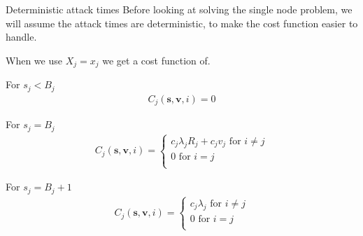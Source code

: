 \documentclass[10pt]{beamer}
\begin{document}
\begin{frame}{Deterministic attack times}
Before looking at solving the single node problem, we will assume the attack times are deterministic, to make the cost function easier to handle.

When we use $X_{j}=x_{j}$ we get a cost function of.

For $s_{j} < B_{j}$
\begin{align*}
C_{j}(\bm{s},\bm{v},i)=0
\end{align*}

For $s_{j}=B_{j}$
\begin{align*}
C_{j}(\bm{s},\bm{v},i)= \begin{cases}
c_{j} \lambda_{j} R_{j} + c_{j} v_{j}  \text{ for } i \neq j \\
0 \text{ for } i=j \\
\end{cases}  
\end{align*}

For $s_{j}=B_{j}+1$
\begin{align*}
C_{j}(\bm{s},\bm{v},i)= \begin{cases}
c_{j} \lambda_{j} \text{ for } i \neq j \\
0 \text{ for } i=j \\
\end{cases}
\end{align*}

\end{frame}
\end{document}
